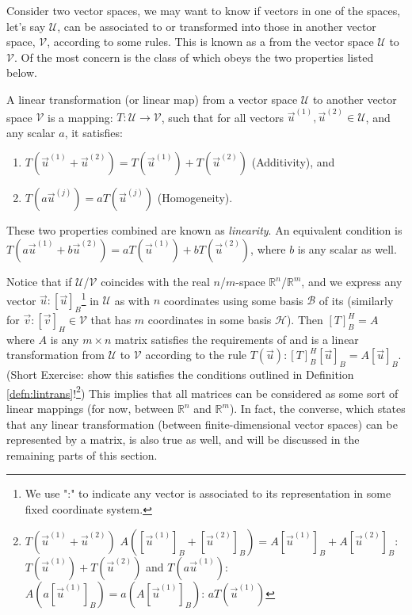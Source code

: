 Consider two vector spaces, we may want to know if vectors in one of the spaces, let's say $\mathcal{U}$, can be associated to or transformed into those in another vector space, $\mathcal{V}$, according to some rules. This is known as a  from the vector space $\mathcal{U}$ to $\mathcal{V}$. Of the most concern is the class of  which obeys the two properties listed below.
\begin{defn}
\label{defn:lintrans}
A linear transformation (or linear map) from a vector space $\mathcal{U}$ to another vector space $\mathcal{V}$ is a mapping: $T: \mathcal{U} \to \mathcal{V}$, such that for all vectors $\vec{u}^{(1)}, \vec{u}^{(2)} \in \mathcal{U}$, and any scalar $a$, it satisfies:
\begin{enumerate}
    \item $T(\vec{u}^{(1)} + \vec{u}^{(2)}) = T(\vec{u}^{(1)}) + T(\vec{u}^{(2)})$ (Additivity), and
    \item $T(a\vec{u}^{(j)}) = aT(\vec{u}^{(j)})$ (Homogeneity).
\end{enumerate}
These two properties combined are known as \textit{linearity}. An equivalent condition is $T(a\vec{u}^{(1)} + b\vec{u}^{(2)}) = aT(\vec{u}^{(1)}) + bT(\vec{u}^{(2)})$, where $b$ is any scalar as well.
\end{defn}
Notice that if $\mathcal{U}$/$\mathcal{V}$ coincides with the real $n$/$m$-space $\mathbb{R}^n$/$\mathbb{R}^m$, and we express any vector $\vec{u}: [\vec{u}]_B$\footnote{We use ":" to indicate any vector is associated to its representation in some fixed coordinate system.} in $\mathcal{U}$ as with $n$ coordinates using some basis $\mathcal{B}$ of its (similarly for $\vec{v}: [\vec{v}]_{H} \in \mathcal{V}$ that has $m$ coordinates in some basis $\mathcal{H}$). Then $[T]_B^{H} = A$ where $A$ is any $m \times n$ matrix satisfies the requirements of and is a linear transformation from $\mathcal{U}$ to $\mathcal{V}$ according to the rule $T(\vec{u}): [T]_B^{H}[\vec{u}]_B = A[\vec{u}]_B$. (Short Exercise: show this satisfies the conditions outlined in Definition \ref{defn:lintrans}!\footnote{$T(\vec{u}^{(1)}+\vec{u}^{(2)})$ $A([\vec{u}^{(1)}]_B + [\vec{u}^{(2)}]_B) = A[\vec{u}^{(1)}]_B + A[\vec{u}^{(2)}]_B$: $T(\vec{u}^{(1)})+T(\vec{u}^{(2)})$ and $T(a\vec{u}^{(1)})$: $A(a[\vec{u}^{(1)}]_B) = a(A[\vec{u}^{(1)}]_B)$: $aT(\vec{u}^{(1)})$}) This implies that all matrices can be considered as some sort of linear mappings (for now, between $\mathbb{R}^n$ and $\mathbb{R}^m$). In fact, the converse, which states that any linear transformation (between finite-dimensional vector spaces) can be represented by a matrix, is also true as well, and will be discussed in the remaining parts of this section.\\
